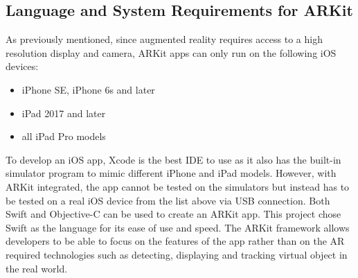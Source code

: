 \subsection{Language and System Requirements for ARKit}
As previously mentioned, since augmented reality requires access to a high resolution display and camera, ARKit apps can only run on the following iOS devices: 
\begin{itemize}
	\item iPhone SE, iPhone 6s and later
	\item iPad 2017 and later
	\item all iPad Pro models
\end{itemize}
To develop an iOS app, Xcode is the best IDE to use as it also has the built-in simulator program to mimic different iPhone and iPad models. However, with ARKit integrated, the app cannot be tested on the simulators but instead has to be tested on a real iOS device from the list above via USB connection.
Both Swift and Objective-C can be used to create an ARKit app. This project chose Swift as the language for its ease of use and speed.
The ARKit framework allows developers to be able to focus on the features of the app rather than on the AR required technologies such as detecting, displaying and tracking virtual object in the real world. 


